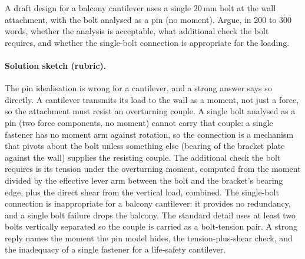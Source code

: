 \begin{exercise}
A draft design for a balcony cantilever uses a single $20\,\si{
\milli\meter}$ bolt at the wall attachment, with the bolt analysed
as a pin (no moment). Argue, in $200$ to $300$ words, whether the
analysis is acceptable, what additional check the bolt requires,
and whether the single-bolt connection is appropriate for the
loading.

\paragraph{Solution sketch (rubric).} The pin idealisation is wrong
for a cantilever, and a strong answer says so directly. A cantilever
transmits its load to the wall as a moment, not just a force, so the
attachment must resist an overturning couple. A single bolt analysed as a
pin (two force components, no moment) cannot carry that couple: a single
fastener has no moment arm against rotation, so the connection is a
mechanism that pivots about the bolt unless something else (bearing of
the bracket plate against the wall) supplies the resisting couple. The
additional check the bolt requires is its tension under the overturning
moment, computed from the moment divided by the effective lever arm
between the bolt and the bracket's bearing edge, plus the direct shear
from the vertical load, combined. The single-bolt connection is
inappropriate for a balcony cantilever: it provides no redundancy, and a
single bolt failure drops the balcony. The standard detail uses at least
two bolts vertically separated so the couple is carried as a bolt-tension
pair. A strong reply names the moment the pin model hides, the
tension-plus-shear check, and the inadequacy of a single fastener for a
life-safety cantilever.
\end{exercise}

